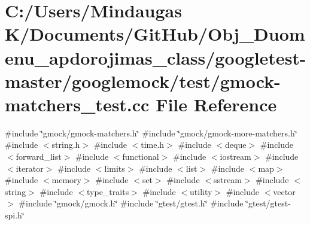 \hypertarget{googletest-master_2googlemock_2test_2gmock-matchers__test_8cc}{}\section{C\+:/\+Users/\+Mindaugas K/\+Documents/\+Git\+Hub/\+Obj\+\_\+\+Duomenu\+\_\+apdorojimas\+\_\+class/googletest-\/master/googlemock/test/gmock-\/matchers\+\_\+test.cc File Reference}
\label{googletest-master_2googlemock_2test_2gmock-matchers__test_8cc}
{\ttfamily \#include \char`\"{}gmock/gmock-\/matchers.\+h\char`\"{}}\newline
{\ttfamily \#include \char`\"{}gmock/gmock-\/more-\/matchers.\+h\char`\"{}}\newline
{\ttfamily \#include $<$string.\+h$>$}\newline
{\ttfamily \#include $<$time.\+h$>$}\newline
{\ttfamily \#include $<$deque$>$}\newline
{\ttfamily \#include $<$forward\+\_\+list$>$}\newline
{\ttfamily \#include $<$functional$>$}\newline
{\ttfamily \#include $<$iostream$>$}\newline
{\ttfamily \#include $<$iterator$>$}\newline
{\ttfamily \#include $<$limits$>$}\newline
{\ttfamily \#include $<$list$>$}\newline
{\ttfamily \#include $<$map$>$}\newline
{\ttfamily \#include $<$memory$>$}\newline
{\ttfamily \#include $<$set$>$}\newline
{\ttfamily \#include $<$sstream$>$}\newline
{\ttfamily \#include $<$string$>$}\newline
{\ttfamily \#include $<$type\+\_\+traits$>$}\newline
{\ttfamily \#include $<$utility$>$}\newline
{\ttfamily \#include $<$vector$>$}\newline
{\ttfamily \#include \char`\"{}gmock/gmock.\+h\char`\"{}}\newline
{\ttfamily \#include \char`\"{}gtest/gtest.\+h\char`\"{}}\newline
{\ttfamily \#include \char`\"{}gtest/gtest-\/spi.\+h\char`\"{}}\newline
